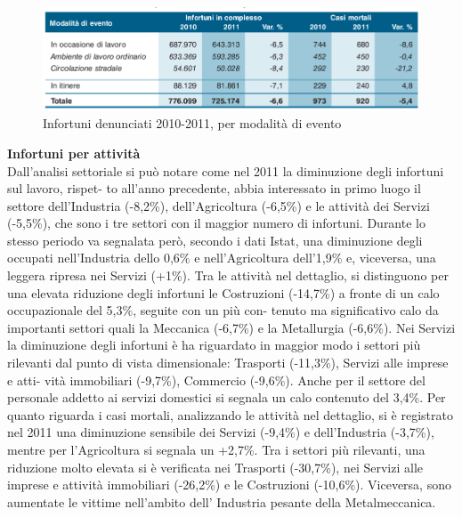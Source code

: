 \begin{figure}[H]
\centering
\includegraphics[scale=0.5]{images/analisiDiMercato/infortuniPerModalita}
\caption{Infortuni denunciati 2010-2011, per modalità di evento}
\end{figure}


\textbf{Infortuni per attività}\\
Dall’analisi settoriale si può notare come nel 2011 la diminuzione degli infortuni sul lavoro, rispet-
to all’anno precedente, abbia interessato in primo luogo il settore dell’Industria (-8,2\%), dell’Agricoltura (-6,5\%) e le attività dei Servizi (-5,5\%), che sono i tre settori con il maggior numero di infortuni.
Durante lo stesso periodo va segnalata però, secondo i dati Istat, una diminuzione degli occupati nell’Industria dello 0,6\% e nell’Agricoltura dell’1,9\% e, viceversa, una leggera ripresa nei Servizi (+1\%).
Tra le attività nel dettaglio, si distinguono per una elevata riduzione degli infortuni le
Costruzioni (-14,7\%) a fronte di un calo occupazionale del 5,3\%, seguite con un più con-
tenuto ma significativo calo da importanti settori quali la Meccanica (-6,7\%) e la
Metallurgia (-6,6\%).
Nei Servizi la diminuzione degli infortuni è ha riguardato in maggior modo i settori
più rilevanti dal punto di vista dimensionale: Trasporti (-11,3\%), Servizi alle imprese e atti-
vità immobiliari (-9,7\%), Commercio (-9,6\%). Anche per il settore del personale addetto
ai servizi domestici si segnala un calo contenuto del 3,4\%.
Per quanto riguarda i casi mortali, analizzando le attività nel dettaglio, si è registrato nel
2011 una diminuzione sensibile dei Servizi (-9,4\%) e dell’Industria (-3,7\%), mentre per
l’Agricoltura si segnala un +2,7\%. Tra i settori più rilevanti, una riduzione molto elevata
si è verificata nei Trasporti (-30,7\%), nei Servizi alle imprese e attività immobiliari (-26,2\%)
e le Costruzioni (-10,6\%). Viceversa, sono aumentate le vittime nell'ambito dell’ Industria pesante della Metalmeccanica.\\\\


